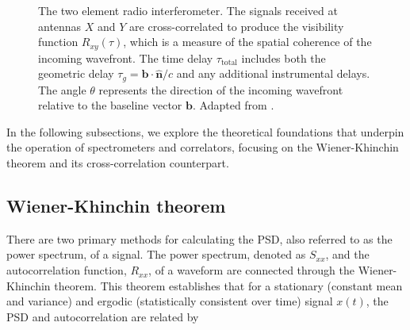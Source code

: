 \begin{figure}[h!]
      \caption[The two element radio interferometer]{The two element radio interferometer. The signals received at antennas $X$ and $Y$ are cross-correlated to produce the visibility function $R_{xy}(\tau)$, which is a measure of the spatial coherence of the incoming wavefront. The time delay $\tau_\text{total}$ includes both the geometric delay $\tau_g = \mathbf{b} \cdot \widehat{\mathbf{n}} / c$ and any additional instrumental delays. The angle $\theta$ represents the direction of the incoming wavefront relative to the baseline vector $\mathbf{b}$. Adapted from \citet{Cassanelli_2022}.}
	  \label{fig:correlator_schematic}
\end{figure}

In the following subsections, we explore the theoretical foundations that underpin the operation of spectrometers and correlators, focusing on the Wiener-Khinchin theorem and its cross-correlation counterpart.
\subsection{Wiener-Khinchin theorem}
There are two primary methods for calculating the PSD, also referred to as the power spectrum, of a signal. The power spectrum, denoted as $S_{xx}$, and the autocorrelation function, $R_{xx}$, of a waveform are connected through the Wiener-Khinchin theorem. This theorem establishes that for a stationary (constant mean and variance) and ergodic (statistically consistent over time) signal $x(t)$, the PSD and autocorrelation are related by

